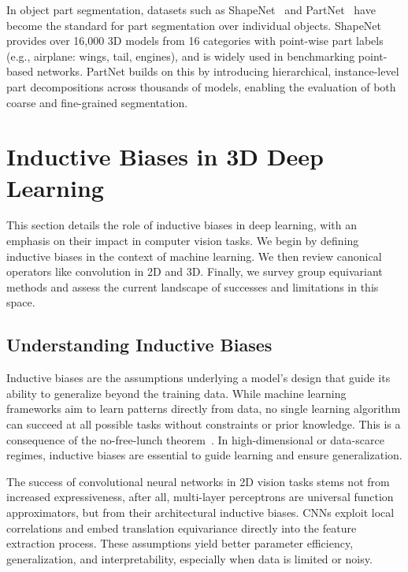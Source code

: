 In object part segmentation, datasets such as ShapeNet~\cite{chang2015shapenet}
and PartNet~\cite{mo2019partnet} have become the standard for part segmentation
over individual objects. ShapeNet provides over 16,000 3D models from 16
categories with point-wise part labels (e.g., airplane: wings, tail, engines),
and is widely used in benchmarking point-based networks. PartNet builds on this
by introducing hierarchical, instance-level part decompositions across
thousands of models, enabling the evaluation of both coarse and fine-grained
segmentation.

\section{Inductive Biases in 3D Deep Learning}\label{sec:inductive_biases}

This section details the role of inductive biases in deep learning, with an
emphasis on their impact in computer vision tasks. We begin by defining
inductive biases in the context of machine learning. We then review canonical
operators like convolution in 2D and 3D. Finally, we survey group equivariant
methods and assess the current landscape of successes and limitations in this
space.

\subsection{Understanding Inductive Biases}

Inductive biases are the assumptions underlying a model's design that guide its
ability to generalize beyond the training data.
%
While machine learning frameworks aim to learn patterns directly from data, no
single learning algorithm can succeed at all possible tasks without constraints
or prior knowledge.
%
This is a consequence of the no-free-lunch
theorem~\cite{baxter2000model,goyal2022inductive}.
%
In high-dimensional or data-scarce regimes, inductive biases are essential to
guide learning and ensure generalization.

The success of convolutional neural networks in 2D vision tasks stems not from
increased expressiveness, after all, multi-layer perceptrons are universal
function approximators, but from their architectural inductive biases.
%
CNNs exploit local correlations and embed translation equivariance directly
into the feature extraction process. These assumptions yield better parameter
efficiency, generalization, and interpretability, especially when data is
limited or noisy.

